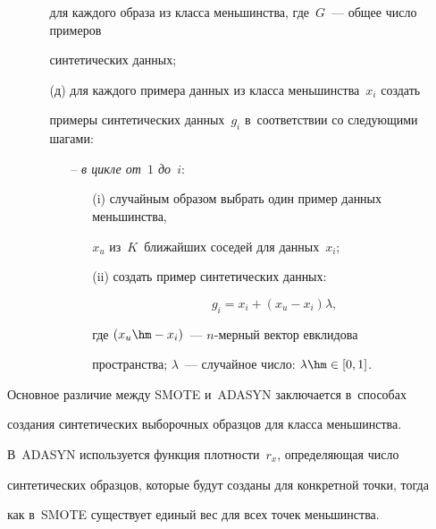 \begin{multicols}{2}
\begin{enumerate}[1.]
\begin{itemize}
для каждого образа из класса меньшинства, где~$G$~--- общее число примеров 

синтетических данных; 

\item[(д)] для каждого примера данных из класса меньшинства~$x_i$ создать 

примеры синтетических данных~$g_i$ в~соответствии со сле\-ду\-ющи\-ми шагами: 

\begin{itemize}



\pagebreak



\item[--]  \textit{в цикле от~$1$ до~$i$}:

  \begin{itemize}

  \item[(i)] случайным образом выбрать один пример данных меньшинства, 

$x_u$ из~$K$~ближайших соседей для данных~$x_i$;

  \item[(ii)] создать пример синтетических данных: 

  $$

  g_i= x_i+ (x_u-  x_i)\lambda,

  $$

   где $(x_u\hm- x_i)$~--- $n$-мер\-ный вектор евклидова 

пространства; $\lambda$~---  случайное число: $\lambda\hm\in [0,1]$.

  \end{itemize}

  \end{itemize}

  \end{itemize}

\end{enumerate}

  

  Основное различие между SMOTE и~ADASYN заключается в~способах 

создания синтетических выборочных образцов для класса меньшинства. 

В~ADASYN используется функция плотности~$r_x$, определяющая число 

синтетических образцов, которые будут созданы для конкретной точки, тогда 

как в~SMOTE существует единый вес для всех точек меньшинства.


\end{multicols}
